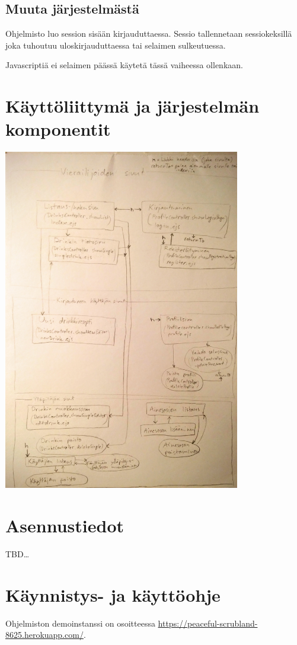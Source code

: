 \documentclass[a4paper]{article}
\begin{document}
\subsection{Muuta järjestelmästä}
Ohjelmisto luo session sisään kirjauduttaessa. Sessio tallennetaan sessiokeksillä joka tuhoutuu uloskirjauduttaessa tai selaimen sulkeutuessa.

Javascriptiä ei selaimen päässä käytetä tässä vaiheessa ollenkaan.

\section{Käyttöliittymä ja järjestelmän komponentit}
\includegraphics[width=\textwidth, height=15cm, keepaspectratio]{komponenttikaavio}

\section{Asennustiedot}
TBD\ldots{}

\section{Käynnistys- ja käyttöohje}
Ohjelmiston demoinstanssi on osoitteessa \url{https://peaceful-scrubland-8625.herokuapp.com/}.
\end{document}
